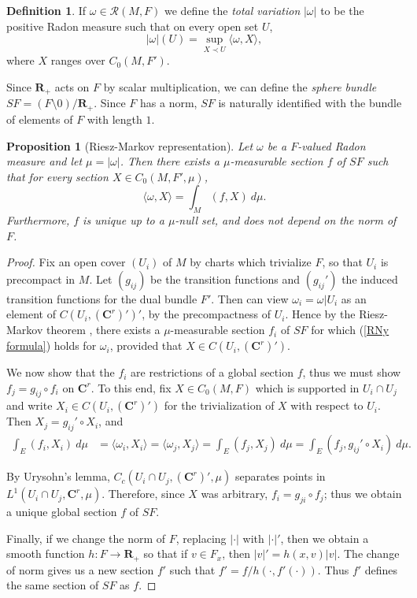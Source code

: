 \documentclass[reqno,12pt,letterpaper]{amsart}
\newcommand{\RR}{\mathbf{R}}
\newcommand{\CC}{\mathbf{C}}
\newcommand{\dfn}[1]{\emph{#1}\index{#1}}
\newtheorem{proposition}[theorem]{Proposition}
\theoremstyle{definition}
\newtheorem{definition}[theorem]{Definition}
\numberwithin{equation}{section}
\begin{document}
\begin{definition}
If $\omega \in \mathcal R(M, F)$ we define the \dfn{total variation} $|\omega|$ to be the positive Radon measure such that on every open set $U$,
$$|\omega|(U) = \sup_{X \prec U} \langle \omega, X\rangle,$$
where $X$ ranges over $C_0(M, F')$.
\end{definition}

Since $\RR_+$ acts on $F$ by scalar multiplication, we can define the \dfn{sphere bundle} $SF = (F \setminus 0)/\RR_+$.
Since $F$ has a norm, $SF$ is naturally identified with the bundle of elements of $F$ with length $1$.

\begin{proposition}[Riesz-Markov representation]\label{HanhJordan}
Let $\omega$ be a $F$-valued Radon measure and let $\mu = |\omega|$.
Then there exists a $\mu$-measurable section $f$ of $SF$ such that for every section $X \in C_0(M, F', \mu)$,
\begin{equation}\label{RNy formula}
\langle \omega, X\rangle = \int_M (f, X) ~d\mu.
\end{equation}
Furthermore, $f$ is unique up to a $\mu$-null set, and does not depend on the norm of $F$.
\end{proposition}
\begin{proof}
Fix an open cover $(U_i)$ of $M$ by charts which trivialize $F$, so that $U_i$ is precompact in $M$.
Let $(g_{ij})$ be the transition functions and $(g_{ij}')$ the induced transition functions for the dual bundle $F'$.
Then can view $\omega_i = \omega|U_i$ as an element of $C(U_i, (\CC^r)')'$, by the precompactness of $U_i$.
Hence by the Riesz-Markov theorem \cite[Theorem 4.14]{simon1983GMT}, there exists a $\mu$-measurable section $f_i$ of $SF$ for which (\ref{RNy formula}) holds for $\omega_i$, provided that $X \in C(U_i, (\CC^r)')$.

We now show that the $f_i$ are restrictions of a global section $f$, thus we must show $f_j = g_{ij} \circ f_i$ on $\CC^r$.
To this end, fix $X \in C_0(M, F)$ which is supported in $U_i \cap U_j$ and write $X_i \in C(U_i, (\CC^r)')$ for the trivialization of $X$ with respect to $U_i$.
Then $X_j = g_{ij}' \circ X_i$, and
\begin{align*}
\int_E (f_i, X_i) ~d\mu &= \langle \omega_i, X_i\rangle = \langle \omega_j, X_j\rangle = \int_E (f_j, X_j) ~d\mu = \int_E (f_j, g_{ij}' \circ X_i) ~d\mu.
\end{align*}

By Urysohn's lemma, $C_c(U_i \cap U_j, (\CC^r)', \mu)$ separates points in $L^1(U_i \cap U_j, \CC^r, \mu)$.
Therefore, since $X$ was arbitrary, $f_i = g_{ji} \circ f_j$; thus we obtain a unique global section $f$ of $SF$.

Finally, if we change the norm of $F$, replacing $|\cdot|$ with $|\cdot|'$, then we obtain a smooth function $h: F \to \RR_+$ so that if $v \in F_x$, then $|v|' = h(x, v)|v|$.
The change of norm gives us a new section $f'$ such that $f' = f/h(\cdot, f'(\cdot))$.
Thus $f'$ defines the same section of $SF$ as $f$.
\end{proof}
\end{document}
